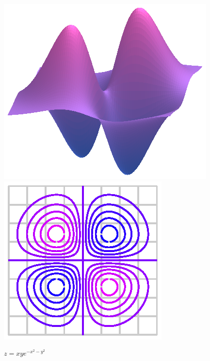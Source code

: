 \begin{figure}[ht]
  \begin{center}
    \includegraphics{figures/exp.eps}
    \hspace*{30pt}
    \includegraphics{figures/exp_contours.eps}
  \end{center}
  \caption{$z=xye^{-x^2-y^2}$}
\end{figure}


